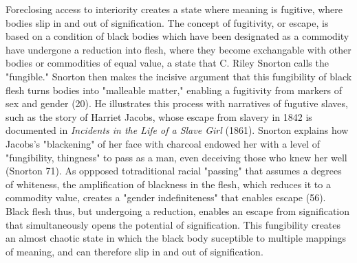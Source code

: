 \documentclass[11pt]{article}
\begin{document}
Foreclosing access to interiority creates a state where meaning is
fugitive, where bodies slip in and out of signification. The concept
of fugitivity, or escape, is based on a condition of black bodies
which have been designated as a commodity have undergone a reduction
into flesh, where they become exchangable with other bodies or
commodities of equal value, a state that C. Riley Snorton calls the
"fungible." Snorton then makes the incisive argument that this
fungibility of black flesh turns bodies into "malleable matter,"
enabling a fugitivity from markers of sex and gender (20). He
illustrates this process with narratives of fugutive slaves, such as
the story of Harriet Jacobs, whose escape from slavery in 1842 is
documented in \emph{Incidents in the Life of a Slave Girl} (1861). Snorton
explains how Jacobs's "blackening" of her face with charcoal endowed
her with a level of "fungibility, thingness" to pass as a man, even
deceiving those who knew her well (Snorton 71). As oppposed
totraditional racial "passing" that assumes a degrees of whiteness,
the amplification of blackness in the flesh, which reduces it to a
commodity value, creates a "gender indefiniteness" that enables escape
(56). Black flesh thus, but undergoing a reduction, enables an escape
from signification that simultaneously opens the potential of
signification. This fungibility creates an almost chaotic state in
which the black body suceptible to multiple mappings of meaning, and
can therefore slip in and out of signification.
\end{document}
